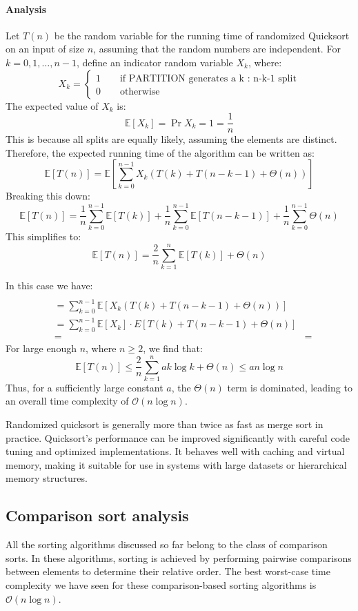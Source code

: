\paragraph*{Analysis}
Let $T(n)$ be the random variable for the running time of randomized Quicksort on an input of size $n$, assuming that the random numbers are independent.
For $k=0,1,\dots,n-1$, define an indicator random variable $X_k$, where:
\[X_k=\begin{cases}
    1 \qquad \text{if PARTITION generates a k : n-k-1 split} \\
    0 \qquad \text{otherwise}
\end{cases}\]
The expected value of $X_k$ is: 
\[\mathbb{E}[X_k] = \Pr{X_k = 1} = \dfrac{1}{n}\]
This is because all splits are equally likely, assuming the elements are distinct. 
Therefore, the expected running time of the algorithm can be written as:
\[\mathbb{E}[T(n)] = \mathbb{E} \left[ \sum_{k=0}^{n-1} X_k \left( T(k) + T(n - k - 1) + \Theta(n) \right) \right]\]
Breaking this down:
\[\mathbb{E}[T(n)] =\frac{1}{n} \sum_{k=0}^{n-1} \mathbb{E}[T(k)] + \frac{1}{n} \sum_{k=0}^{n-1} \mathbb{E}[T(n - k - 1)] + \frac{1}{n} \sum_{k=0}^{n-1} \Theta(n)\]
This simplifies to:
\[\mathbb{E}[T(n)] =\frac{2}{n} \sum_{k=1}^{n} \mathbb{E}[T(k)] + \Theta(n)\]


In this case we have: 
\begin{align*}
     \\
            &= \sum_{k=0}^{n-1} \mathbb{E} \left[ X_k \left( T(k) + T(n - k - 1) + \Theta(n) \right) \right] \\
            &= \sum_{k=0}^{n-1} \mathbb{E}[X_k] \cdot E \left[ T(k) + T(n - k - 1) + \Theta(n) \right] \\
            &= 
            &= 
\end{align*}
For large enough $n$, where $n \geq 2$, we find that:
\[\mathbb{E}[T(n)]\leq \frac{2}{n} \sum_{k=1}^{n} ak\log k + \Theta(n)\leq an\log n\]
Thus, for a sufficiently large constant $a$, the $\Theta(n)$ term is dominated, leading to an overall time complexity of $\mathcal{O}(n\log n)$. 

Randomized quicksort is generally more than twice as fast as merge sort in practice.
Quicksort's performance can be improved significantly with careful code tuning and optimized implementations.
It behaves well with caching and virtual memory, making it suitable for use in systems with large datasets or hierarchical memory structures.

\subsection{Comparison sort analysis}
All the sorting algorithms discussed so far belong to the class of comparison sorts.
In these algorithms, sorting is achieved by performing pairwise comparisons between elements to determine their relative order.
The best worst-case time complexity we have seen for these comparison-based sorting algorithms is $\mathcal{O}(n\log n)$. 

